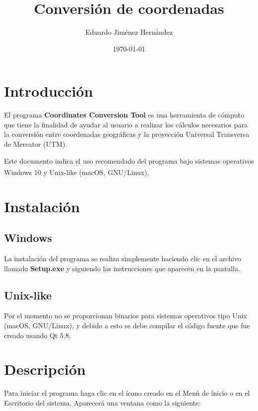 \documentclass[12pt, letterpaper]{article}
\begin{document}
\title{Conversión de coordenadas}
\author{Eduardo Jiménez Hernández}
\date{\today}
\maketitle

\section{Introducción}

El programa \textbf{Coordinates Conversion Tool} es una herramienta de cómputo que tiene la finalidad de ayudar al usuario a realizar los cálculos necesarios para la conversión entre coordenadas geográficas y la proyección Universal Transversa de Mercator (UTM).

Este documento indica el uso recomendado del programa bajo sistemas operativos Windows 10\textsuperscript{\textregistered} y Unix-like (macOS, GNU/Linux).

\section{Instalación}

\subsection{Windows}

La instalación del programa se realiza simplemente haciendo clic en el archivo llamado \textbf{Setup.exe} y siguiendo las instrucciones que aparecen en la pantalla.

\subsection{Unix-like}

Por el momento no se proporcionan binarios para sistemas operativos tipo Unix (macOS, GNU/Linux), y debido a esto se debe compilar el código fuente que fue creado usando Qt 5.8.

\section{Descripción}

Para iniciar el programa haga clic en el ícono creado en el Menú de inicio o en el Escritorio del sistema. Aparecerá una ventana como la siguiente:
\end{document}
